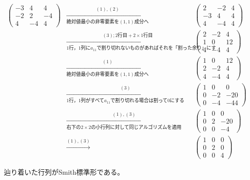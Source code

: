 \documentclass[uplatex]{jsarticle}
\begin{document}
\begin{rei}
  \begin{center}
    $\begin{array}{ccc}
      \begin{pmatrix}
        -3 & 4 & 4 \\ -2 & 2 & -4 \\ 4 & -4 & 4
      \end{pmatrix} & \xrightarrow[\text{絶対値最小の非零要素を$(1,1)$成分へ}]{(1),(2)}
      & \begin{pmatrix}
        2 & -2 & 4 \\ -3 & 4 & 4 \\ 4 & -4 & 4
      \end{pmatrix} \\ & \xrightarrow[\text{1行，1列に$a_{11}$で割り切れないものがあればそれを「割った余り」にする}]{(3); 2 \text{行目} + 2 \times 1 \text{行目}}
      & \begin{pmatrix}
        2 & -2 & 4 \\ 1 & 0 & 12 \\ 4 & -4 & 4
      \end{pmatrix} \\ & \xrightarrow[\text{絶対値最小の非零要素を$(1,1)$成分へ}]{(1)}
      & \begin{pmatrix}
        1 & 0 & 12 \\ 2 & -2 & 4 \\ 4 & -4 & 4
      \end{pmatrix} \\ & \xrightarrow[\text{1行，1列がすべて$a_{11}$で割り切れる場合は割って0にする}]{(3)}
      & \begin{pmatrix}
        1 & 0 & 0 \\ 0 & -2 & -20 \\ 0 & -4 & -44
      \end{pmatrix} \\ & \xrightarrow[\text{右下の$2 \times 2$の小行列に対して同じアルゴリズムを適用}]{(1),(3)}
      & \begin{pmatrix}
        1 & 0 & 0 \\ 0 & 2 & -20 \\ 0 & 0 & -4
      \end{pmatrix} \\ & \xrightarrow{(1),(3)}
      & \begin{pmatrix}
        1 & 0 & 0 \\ 0 & 2 & 0 \\ 0 & 0 & 4
      \end{pmatrix}
    \end{array}$
  \end{center}
  辿り着いた行列がSmith標準形である。
\end{rei}
\end{document}
